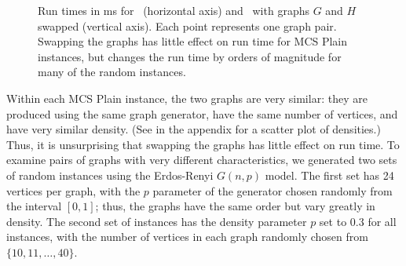 \begin{figure}[h!]
    \centering
    \caption{Run times in ms for \McSplit\ (horizontal axis) and \McSplit\ with graphs $G$ and $H$ swapped
        (vertical axis).  Each point represents one graph pair.  Swapping the graphs has little effect on run time
        for MCS Plain instances, but changes the run time by orders of magnitude
        for many of the random instances.}\label{figure:runtime-swapping-scatter}
\end{figure}

Within each MCS Plain instance, the two graphs are very similar: they are produced
using the same graph generator, have the same number of vertices, and have very similar density.
(See  in the appendix for a scatter plot of densities.)
Thus, it is unsurprising that swapping the graphs has little effect on run time.
To examine pairs of graphs with very different characteristics, we generated two
sets of random instances using the Erdos-Renyi $G(n,p)$ model.  The first set has
24 vertices per graph, with the $p$ parameter of the generator chosen randomly from
the interval $[0,1]$; thus, the graphs have the same order but vary
greatly in density.  The second set of instances has the density parameter
$p$ set to $0.3$ for all instances, with the number of vertices in each graph randomly
chosen from $\{10, 11, \dots, 40\}$.

